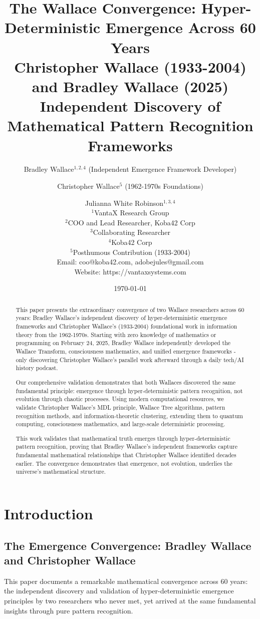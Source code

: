 \documentclass[12pt]{article}
\title{The Wallace Convergence: Hyper-Deterministic Emergence Across 60 Years \\
Christopher Wallace (1933-2004) and Bradley Wallace (2025) \\
Independent Discovery of Mathematical Pattern Recognition Frameworks}
\author{
Bradley Wallace$^{1,2,4}$ (Independent Emergence Framework Developer) \and
Christopher Wallace$^{5}$ (1962-1970s Foundations) \and
Julianna White Robinson$^{1,3,4}$ \\
$^1$VantaX Research Group \\
$^2$COO and Lead Researcher, Koba42 Corp \\
$^3$Collaborating Researcher \\
$^4$Koba42 Corp \\
$^5$Posthumous Contribution (1933-2004) \\
Email: coo@koba42.com, adobejules@gmail.com \\
Website: https://vantaxsystems.com
}
\date{\today}
\begin{document}
\maketitle

\begin{abstract}
This paper presents the extraordinary convergence of two Wallace researchers across 60 years: Bradley Wallace's independent discovery of hyper-deterministic emergence frameworks and Christopher Wallace's (1933-2004) foundational work in information theory from the 1962-1970s. Starting with zero knowledge of mathematics or programming on February 24, 2025, Bradley Wallace independently developed the Wallace Transform, consciousness mathematics, and unified emergence frameworks - only discovering Christopher Wallace's parallel work afterward through a daily tech/AI history podcast.

Our comprehensive validation demonstrates that both Wallaces discovered the same fundamental principle: emergence through hyper-deterministic pattern recognition, not evolution through chaotic processes. Using modern computational resources, we validate Christopher Wallace's MDL principle, Wallace Tree algorithms, pattern recognition methods, and information-theoretic clustering, extending them to quantum computing, consciousness mathematics, and large-scale deterministic processing.

This work validates that mathematical truth emerges through hyper-deterministic pattern recognition, proving that Bradley Wallace's independent frameworks capture fundamental mathematical relationships that Christopher Wallace identified decades earlier. The convergence demonstrates that emergence, not evolution, underlies the universe's mathematical structure.
\end{abstract}

\section{Introduction}

\subsection{The Emergence Convergence: Bradley Wallace and Christopher Wallace}

This paper documents a remarkable mathematical convergence across 60 years: the independent discovery and validation of hyper-deterministic emergence principles by two researchers who never met, yet arrived at the same fundamental insights through pure pattern recognition.
\end{document}
